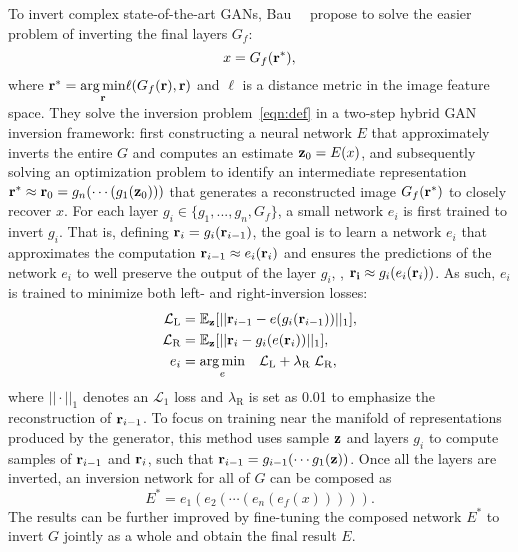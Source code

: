 To invert complex state-of-the-art GANs, Bau~\etal~\cite{bau2019seeing} propose to solve the easier problem of inverting the final layers $G_f$:
\begin{equation}
x = G_f(\rr^{*}),
\label{eqn:ganseeing}
\end{equation}
where $\mathbf{r}^{*} = \underset{\mathbf{r}}{\arg\min} \ell(G_f(\mathbf{r}), \mathbf{r})$ and $\ell$ is a distance metric in the image feature space. 
They solve the inversion problem~\eqref{eqn:def} in a two-step hybrid GAN inversion framework: first constructing a neural network $E$ that approximately inverts the entire $G$ and computes an estimate $\mathbf{z}_0 = E(x)$, and subsequently solving an optimization problem to identify an intermediate representation $\mathbf{r}^* \approx \mathbf{r}_0 = g_n(\cdots(g_1(\mathbf{z}_0)))$ that generates a reconstructed image $G_f(\mathbf{r}^*)$ to closely recover $x$.
For each layer $g_i \in \{g_1,...,g_n, G_f\}$, a small network $e_i$ is first trained to invert $g_i$. 
That is, defining $\mathbf{r}_i = g_i(\mathbf{r}_{i-1})$, the goal is to learn a network $e_i$ that approximates the computation $\mathbf{r}_{i-1} \approx e_i(\mathbf{r}_{i})$ and ensures the predictions of the network $e_i$ to well preserve the output of the layer $g_i$, \ie, $\mathbf{r_{i}} \approx g_i(e_i(\mathbf{r}_{i}))$.
As such, $e_i$ is trained to minimize both left- and right-inversion losses:
\begin{equation}
\begin{aligned}
\mathcal{L}_{\text{L}} & = \mathbb{E}_{\mathbf{z}}[||\mathbf{r}_{i-1}- e(g_i(\mathbf{r}_{i-1}))||_1], \\
\mathcal{L}_{\text{R}} & = \mathbb{E}_{\mathbf{z}}[||\mathbf{r}_i - g_i(e(\mathbf{r}_i))||_1],\\
e_i & = \underset{e}{\arg\min}\quad \mathcal{L}_{\text{L}} + \lambda_{\text{R}}\; \mathcal{L}_{\text{R}},
\end{aligned}
\end{equation}
where $||\cdot||_1$ denotes an $\mathcal{L}_1$ loss and $\lambda_{\text{R}}$ is set as 0.01 to emphasize the reconstruction of $\mathbf{r}_{i-1}$.
To focus on training near the manifold of representations produced by the generator, this method uses sample $\mathbf{z}$ and layers $g_i$ to compute samples of $\mathbf{r}_{i-1}$ and $\mathbf{r}_i$, such that $\mathbf{r}_{i-1} = g_{i-1}(\cdots g_1(\mathbf{z}))$.
Once all the layers are inverted, an inversion network for all of $G$ can be composed as
\begin{equation}
{E}^{*}= e_1(e_2(\cdots(e_n(e_f(x))))).
\end{equation}
The results can be further improved by fine-tuning the composed network $E^*$ to invert $G$ jointly as a whole and obtain the final result $E$.

